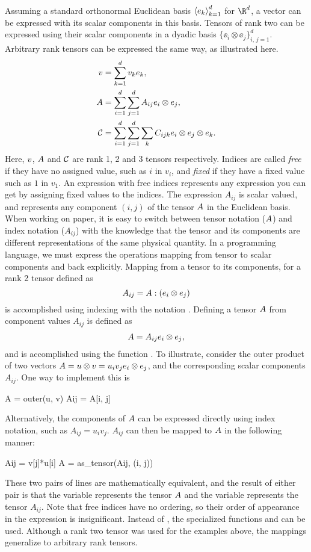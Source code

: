 Assuming a standard orthonormal Euclidean basis $\seq{\ee_k}_{k=1}^d$
for $\R^d$, a vector can be expressed with its scalar components in
this basis.  Tensors of rank two can be expressed using their scalar
components in a dyadic basis $\{ \ee_i\otimes\ee_j \}_{i,\,j=1}^d$.
Arbitrary rank tensors can be expressed the same way, as illustrated here.
\begin{align}
\vv &= \sum_{k=1}^{d} v_k \ee_k,
\\
\AA &= \sum_{i=1}^{d} \sum_{j=1}^{d} A_{ij} \ee_i \otimes \ee_j,
\\
\Cc &= \sum_{i=1}^{d} \sum_{j=1}^{d} \sum_k C_{ijk} \ee_i \otimes \ee_j \otimes \ee_k.
\end{align}
Here, $\vv$, $\AA$ and $\Cc$ are rank 1, 2 and 3 tensors respectively.
Indices are called \emph{free} if they have no assigned value, such as
$i$ in $v_i$, and \emph{fixed} if they have a fixed value such as $1$ in
$v_1$. An expression with free indices represents any expression you can
get by assigning fixed values to the indices.  The expression $A_{ij}$ is
scalar valued, and represents any component $(i,j)$ of the tensor $\AA$ in
the Euclidean basis.  When working on paper, it is easy to switch between
tensor notation ($\AA$) and index notation ($A_{ij}$) with the knowledge
that the tensor and its components are different representations of the
same physical quantity.  In a programming language, we must express the
operations mapping from tensor to scalar components and back explicitly.
Mapping from a tensor to its components, for a rank 2 tensor defined as
\begin{equation}
A_{ij} = \AA : (\ee_i\otimes\ee_j)
\end{equation}
is accomplished using indexing with the notation .  Defining a
tensor $\AA$ from component values $A_{ij}$ is defined as
\begin{align}
\AA = A_{ij} \ee_i\otimes\ee_j,
\end{align}
and is accomplished using the function .
To illustrate, consider the outer product of two vectors $\AA =
\uu\otimes\vv = u_i v_j \ee_i\otimes\ee_j$, and the corresponding scalar
components $A_{ij}$.  One way to implement this is
\begin{uflcode}
A = outer(u, v)
Aij = A[i, j]
\end{uflcode}
Alternatively, the components of $\AA$ can be expressed directly using
index notation, such as $A_{ij} = u_i v_j$.  $A_{ij}$ can then be mapped
to $\AA$ in the following manner:
\begin{uflcode}
Aij = v[j]*u[i]
A = as_tensor(Aij, (i, j))
\end{uflcode}
These two pairs of lines are mathematically equivalent, and the result
of either pair is that the variable  represents the tensor $\AA$
and the variable  represents the tensor $A_{ij}$.  Note that free
indices have no ordering, so their order of appearance in the expression
 is insignificant.  Instead of , the
specialized functions  and  can be used.
Although a rank two tensor was used for the examples above, the mappings
generalize to arbitrary rank tensors.

